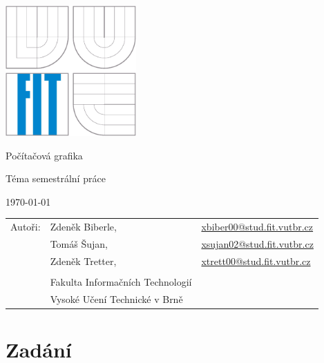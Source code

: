\documentclass[12pt,a4paper,titlepage,final]{report}
\makeatletter
\newcommand\Course{Počítačová grafika}
\newcommand\WorkTitle{Téma semestrální práce}
\newcommand\AuthorA{Zdeněk Biberle}
\newcommand\AuthorAEmail{xbiber00@stud.fit.vutbr.cz}
\newcommand\AuthorB{Tomáš Šujan}
\newcommand\AuthorBEmail{xsujan02@stud.fit.vutbr.cz}
\newcommand\AuthorC{Zdeněk Tretter}
\newcommand\AuthorCEmail{xtrett00@stud.fit.vutbr.cz}
\newcommand\Faculty{Fakulta Informačních Technologií}
\newcommand\School{Vysoké Učení Technické v Brně}
\makeatother
\begin{document}
	\begin{titlepage}
	\begin{center}
		\includegraphics[height=5cm]{images/logo.eps}
	\end{center}
	\vfill
	\begin{center}
		\begin{Large}
			\Course\\
		\end{Large}
		\bigskip
		\begin{Huge}
			\WorkTitle\\
		\end{Huge}
	\end{center}
	\vfill
	\begin{center}
		\begin{large}
			\today
		\end{large}
	\end{center}
	\vfill
	\begin{flushleft}
		\begin{large}
			\begin{tabular}{lll}
				Autoři: & \AuthorA, & \url{\AuthorAEmail} \\
				        & \AuthorB, & \url{\AuthorBEmail} \\
				        & \AuthorC, & \url{\AuthorCEmail} \\
				& & \\
				& \Faculty \\
				& \School \\
			\end{tabular}
		\end{large}
	\end{flushleft}
\end{titlepage}		
	
	
\tableofcontents

\newpage
\chapter{Zadání}
\end{document}
